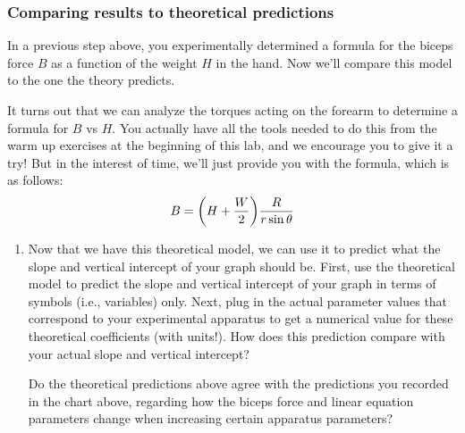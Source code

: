 \documentclass[11pt,letterpaper]{article}
\newcommand{\question}[2][blue]{\textcolor{#1}{#2}}
\newcommand{\yint}[1][]{vertical intercept\xspace}
\newcommand{\temp}[2][]{#1#2}
\renewcommand{\question}[2][]{#2}
\begin{document}
\subsubsection*{Comparing results to theoretical predictions}

In a previous step above,
you experimentally determined a formula for the biceps force $B$ as a function
of the weight $H$ in the hand.  
Now we'll compare this model to the one the theory predicts.

It turns out that we can analyze the torques acting on the forearm
to determine a formula for $B$ vs $H$.  You actually have all the tools needed
to do this from the warm up exercises at the beginning of this lab, and we
encourage you to give it a try!  But in the interest of time, we'll just
provide you with the formula, which is as follows:
\begin{equation*}
	B = {\left(  H + \frac{W}{2}  \right)}\frac{R}{r\sin\theta}
\end{equation*}


\begin{enumerate}[labproc]

\item
Now that we have this theoretical model, 
we can use it to predict what the slope and \yint of your graph should be.
First, use the theoretical model to 
\question{predict the slope and \yint  
of your graph in terms of symbols} (i.e., variables) only.
Next, \question{plug in the actual parameter values 
that correspond to your experimental apparatus}
to get a numerical value for these theoretical coefficients (with units!).
\question{How does this prediction compare 
with your actual slope and \yint ?}

\question{Do the theoretical predictions above agree 
with the predictions you recorded in the chart above},
regarding how the biceps force and linear equation parameters change when
increasing certain apparatus parameters?

\end{enumerate}


\temp{\pagebreak}
\end{document}
